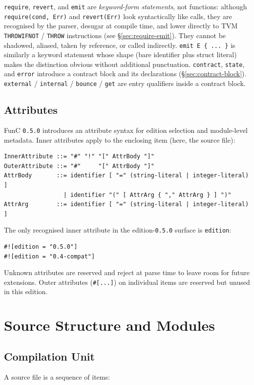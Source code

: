 \documentclass[12pt,oneside]{article}
\begin{document}
\verb|require|, \verb|revert|, and \verb|emit| are \emph{keyword-form
statements}, not functions: although \verb|require(cond, Err)| and
\verb|revert(Err)| look syntactically like calls, they are recognised
by the parser, desugar at compile time, and lower directly to TVM
\verb|THROWIFNOT| / \verb|THROW| instructions (see
\S\ref{sec:require-emit}). They cannot be shadowed, aliased, taken by
reference, or called indirectly. \verb|emit E { ... }| is similarly a
keyword statement whose shape (bare identifier plus struct literal)
makes the distinction obvious without additional punctuation.
\verb|contract|, \verb|state|,
and \verb|error| introduce a contract block and its declarations
(\S\ref{sec:contract-block}). \verb|external| / \verb|internal| /
\verb|bounce| / \verb|get| are entry qualifiers inside a contract
block.

\subsection{Attributes}
\label{sec:attributes}
FunC \verb|0.5.0| introduces an attribute syntax for edition selection and
module-level metadata. Inner attributes apply to the enclosing item (here, the
source file):

\begin{verbatim}
InnerAttribute ::= "#" "!" "[" AttrBody "]"
OuterAttribute ::= "#"     "[" AttrBody "]"
AttrBody       ::= identifier [ "=" (string-literal | integer-literal) ]
                 | identifier "(" [ AttrArg { "," AttrArg } ] ")"
AttrArg        ::= identifier [ "=" (string-literal | integer-literal) ]
\end{verbatim}

The only recognised inner attribute in the edition-\verb|0.5.0| surface is
\verb|edition|:

\begin{verbatim}
#![edition = "0.5.0"]
#![edition = "0.4-compat"]
\end{verbatim}

Unknown attributes are reserved and reject at parse time to leave room for
future extensions. Outer attributes (\verb|#[...]|) on individual items are
reserved but unused in this edition.

\section{Source Structure and Modules}
\subsection{Compilation Unit}
A source file is a sequence of items:
\end{document}
